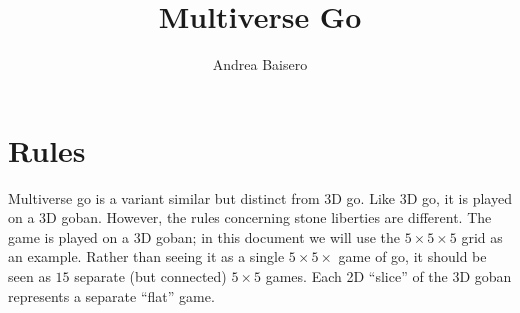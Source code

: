 \documentclass{article}
\title{Multiverse Go}
\author{Andrea Baisero}
\begin{document}
\maketitle

\newcommand\grid[1]{
  \pgfmathsetmacro\size{#1}
  \pgfmathsetmacro\sizemtwo{#1 - 2}

  \draw[ultra thick] (0,0) -- (0,\size - 1);
  \draw[ultra thick] (0,0) -- (\size - 1,0);
  \draw[ultra thick] (0,\size - 1) -- (\size - 1,\size - 1);
  \draw[ultra thick] (\size - 1,0) -- (\size - 1,\size - 1);

  \foreach \i in {1,...,\sizemtwo} {
    \draw (\i,0) -- (\i,\size - 1);
    \draw (0,\i) -- (\size - 1,\i);
  }
}

\newcommand\xlabels[2]{
  \foreach \label [count=\i] in #2 {
    \node at (\i-1,-0.5) {\texttt{\label}};
    \node at (\i-1,#1 -0.5) {\texttt{\label}};

    \ifnum \i=#1
      \breakforeach
    \fi
  }
}

\newcommand\ylabels[2]{
  \foreach \label [count=\i] in #2 {
    \node at (-0.5,\i-1) {\texttt{\label}};
    \node at (#1 -0.5,\i-1) {\texttt{\label}};

    \ifnum \i=#1
      \breakforeach
    \fi
  }
}

\newcommand\upperlabels{A,...,Z}
\newcommand\lowerlabels{a,...,z}
\newcommand\numberlabels{1,...,19}

\newcommand\upperboard[1]{
  \grid{#1}
  \xlabels{#1}{\numberlabels}
  \ylabels{#1}{\lowerlabels}
}

\newcommand\numberboard[1]{
  \grid{#1}
  \xlabels{#1}{\upperlabels}
  \ylabels{#1}{\lowerlabels}
}

\newcommand\lowerboard[1]{
  \grid{#1}
  \xlabels{#1}{\upperlabels}
  \ylabels{#1}{\numberlabels}
}

\section{Rules}

Multiverse go is a variant similar but distinct from 3D go.  Like 3D go, it is
played on a 3D goban.  However, the rules concerning stone liberties are
different.
%
The game is played on a 3D goban;  in this document we will use the $5\times
5\times 5$ grid as an example.  Rather than seeing it as a single $5 \times
5\times$ game of go, it should be seen as $15$ separate (but connected)
$5\times 5$ games.  Each 2D ``slice'' of the 3D goban represents a separate
``flat'' game.
\end{document}
